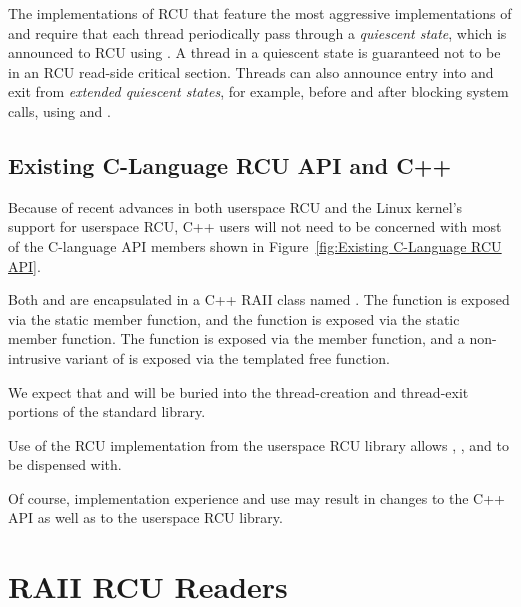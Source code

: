 \documentclass[letterpaper,10pt]{article}
\begin{document}
The implementations of RCU that feature the most aggressive implementations of
 and  require that each thread
periodically pass through a \emph{quiescent state}, which is announced to RCU
using .
A thread in a quiescent state is guaranteed not to be in an RCU
read-side critical section.
Threads can also announce entry into and exit from \emph{extended
quiescent states}, for example, before and after blocking system
calls, using  and .

\subsection{Existing C-Language RCU API and C++}
\label{sec:Existing C-Language RCU API and C++}

Because of recent advances in both userspace RCU and the Linux kernel's
support for userspace RCU, C++ users will not need to be concerned
with most of the C-language API members shown in
Figure~\ref{fig:Existing C-Language RCU API}.

Both  and  are encapsulated
in a C++ RAII class named .
The  function is exposed via the
 static member function, and
the  function is exposed via the
 static member function.
The  function is exposed via the
 member function,
and a non-intrusive variant of  is exposed via the
 templated free function.

We expect that  and 
will be buried into the thread-creation and thread-exit portions of the
standard library.

Use of the  RCU implementation from the userspace
RCU library allows , ,
and  to be dispensed with.

Of course, implementation experience and use may result in changes
to the C++ API as well as to the userspace RCU library.

\section{RAII RCU Readers}
\label{sec:RAII RCU Readers}
\end{document}
